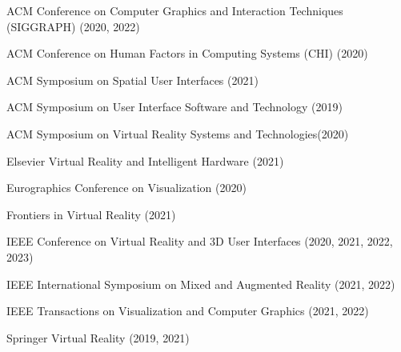     \begin{cvitems} %
    \item {ACM Conference on Computer Graphics and Interaction Techniques (SIGGRAPH) (2020, 2022)}
    \item {ACM Conference on Human Factors in Computing Systems (CHI) (2020)}
    \item {ACM Symposium on Spatial User Interfaces (2021)}
    \item {ACM Symposium on User Interface Software and Technology (2019)}
    \item {ACM Symposium on Virtual Reality Systems and Technologies(2020)}
    \item {Elsevier Virtual Reality and Intelligent Hardware (2021)}
    \item {Eurographics Conference on Visualization (2020)}
    \item {Frontiers in Virtual Reality (2021)}
    \item {IEEE Conference on Virtual Reality and 3D User Interfaces (2020, 2021, 2022, 2023)}
    \item {IEEE International Symposium on Mixed and Augmented Reality (2021, 2022)}
    \item {IEEE Transactions on Visualization and Computer Graphics (2021, 2022)}
    \item {Springer Virtual Reality (2019, 2021)}
    \end{cvitems}
  


